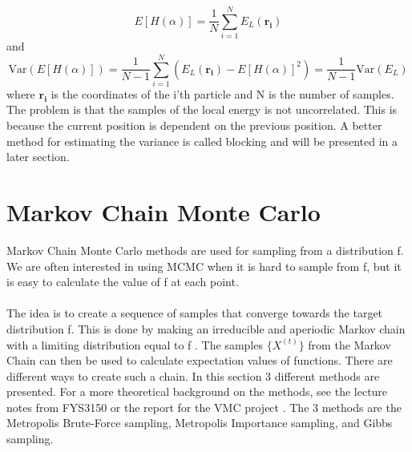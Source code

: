 \begin{equation}
    E[H(\alpha)] = \frac{1}{N}\sum_{i=1}^N E_L(\boldsymbol{r_i})
\end{equation}
and 
\begin{equation}
    \text{Var}(E[H(\alpha)]) = \frac{1}{N-1}\sum_{i=1}^N (E_L(\boldsymbol{r_i}) - E[H(\alpha)]^2) = \frac{1}{N-1}\text{Var}(E_L)
\end{equation}
where $\boldsymbol{r_i}$ is the coordinates of the i'th particle and N is the number of samples. The problem is that the samples of the local energy is not uncorrelated. This is because the current position is dependent on the previous position. A better method for estimating the variance is called blocking and will be presented in a later section. 


\section{Markov Chain Monte Carlo}
Markov Chain Monte Carlo methods are used for sampling from a distribution f. We are often interested in using MCMC when it is hard to sample from f, but it is easy to calculate the value of f at each point. 
\\
\\
The idea is to create a sequence of samples that converge towards the target distribution f. This is done by making an irreducible and  aperiodic Markov chain with a limiting distribution equal to f \cite{compstat}. The samples $\{X^{(t)}\}$ from the Markov Chain can then be used to calculate expectation values of functions. There are different ways to create such a chain. In this section 3 different methods are presented. For a more theoretical background on the methods, see the lecture notes from FYS3150 \cite{mhj_book} or the report for the VMC project \cite{4411}. The 3 methods are the Metropolis Brute-Force sampling, Metropolis Importance sampling, and Gibbs sampling. 

